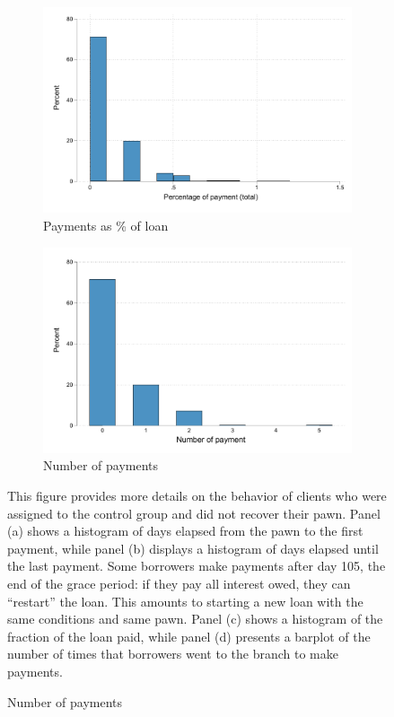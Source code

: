 \begin{appendix}
\begin{figure}[!h]
\begin{center}
\begin{subfigure}{0.35\textwidth}
    \end{subfigure}
        \begin{subfigure}{0.35\textwidth}
        \caption{Payments as \% of loan}
        \centering
        \includegraphics[width=\textwidth]{Figuras/hist_percpay_default.pdf}
    \end{subfigure}
    \begin{subfigure}{0.35\textwidth}
        \caption{Number of payments}
        \centering
        \includegraphics[width=\textwidth]{Figuras/hist_numpay_default.pdf}
    \end{subfigure}
    \end{center}
        \footnotesize{This figure provides more details on the behavior of clients who were assigned to the control group and did not recover their pawn. Panel (a) shows a histogram of days elapsed from the pawn to the first payment, while panel (b) displays a histogram of days elapsed until the last payment. Some borrowers make payments after day 105, the end of the grace period: if they pay all interest owed, they can ``restart'' the loan. This amounts to starting a new loan with the same conditions and same pawn. Panel (c) shows a histogram of the fraction of the loan paid, while panel (d) presents a barplot of the number of times that borrowers went to the branch to make payments.}
        \label{proxy_naive}
\end{figure}


\end{appendix}
